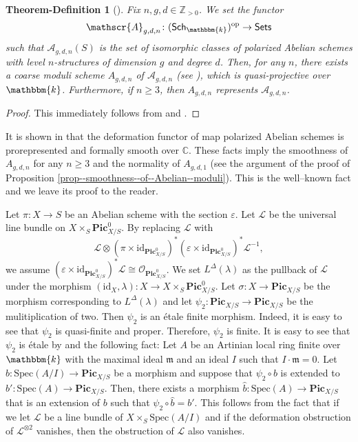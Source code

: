 \documentclass[12pt,twoside]{amsart}
\newtheorem{thm2}[thm]{Theorem-Definition}
\theoremstyle{definition}
\begin{document}
\begin{thm2}[{\cite{GIT}}]\label{thm--abel-scheme}
Fix $n,g,d\in\mathbb{Z}_{>0}$.
We set the functor 
$$\mathscr{A}_{g,d,n}\colon(\mathsf{Sch}_\mathbbm{k})^{\mathrm{op}}\to\mathsf{Sets}$$ such that $\mathscr{A}_{g,d,n}(S)$ is the set of isomorphic classes of polarized Abelian schemes with level $n$-structures of dimension $g$ and degree $d$.
Then, for any $n$, there exists a coarse moduli scheme $A_{g,d,n}$ of $\mathscr{A}_{g,d,n}$ (see \cite[Definition 5.6]{GIT}), which is quasi-projective over $\mathbbm{k}$.
Furthermore, if $n\ge 3$, then $A_{g,d,n}$ represents $\mathscr{A}_{g,d,n}$. 
\end{thm2}

\begin{proof}
    This immediately follows from \cite[Theorem 7.10]{GIT} and \cite[p.~191, Theorem 5]{Ab}.
\end{proof}


It is shown in \cite[Propositions 2.2.3.7 and 2.2.4.4]{Lan} that the deformation functor of map polarized Abelian schemes is prorepresented and formally smooth over $\mathbb{C}$.
These facts imply the smoothness of $A_{g,d,n}$ for any $n\ge3$ and  the normality of $A_{g,d,1}$ (see the argument of the proof of Proposition \ref{prop--smoothness--of--Abelian--moduli}).
This is the well--known fact and we leave its proof to the reader.

Let $\pi\colon X\to S$ be an Abelian scheme with the section $\varepsilon$.
 Let $\mathcal{L}$ be the universal line bundle on $X\times_S\mathbf{Pic}^0_{X/S}$.
    By replacing $\mathcal{L}$ with 
    $$\mathcal{L}\otimes(\pi\times\mathrm{id}_{\mathbf{Pic}^0_{X/S}})^*(\varepsilon\times\mathrm{id}_{\mathbf{Pic}^0_{X/S}})^*\mathcal{L}^{-1},$$ we assume $(\varepsilon\times\mathrm{id}_{\mathbf{Pic}^0_{X/S}})^*\mathcal{L}\cong\mathcal{O}_{\mathbf{Pic}^0_{X/S}}$.
    We set $L^\Delta(\lambda)$ as the pullback of $\mathcal{L}$ under the morphism $(\mathrm{id}_{X},\lambda)\colon X\to X\times_S \mathbf{Pic}^0_{X/S}$.
Let $\sigma\colon X\to \mathbf{Pic}_{X/S}$ be the morphism corresponding to $L^\Delta(\lambda)$ and let $\psi_2\colon \mathbf{Pic}_{X/S}\to \mathbf{Pic}_{X/S}$ be the mulitiplication of two.
Then $\psi_2$ is an \'etale finite morphism.
Indeed, it is easy to see that $\psi_2$ is quasi-finite and proper.
Therefore, $\psi_2$ is finite.
It is easy to see that $\psi_2$ is \'etale by \cite[Theorem 3.1 (iii)]{SGA} and the following fact:
Let $A$ be an Artinian local ring finite over $\mathbbm{k}$ with the maximal ideal $\mathfrak{m}$ and an ideal $I$ such that $I\cdot \mathfrak{m}=0$. 
Let $b\colon\mathrm{Spec}(A/I)\to \mathbf{Pic}_{X/S}$ be a morphism and suppose that $\psi_2\circ b$ is extended to $b'\colon \mathrm{Spec}(A)\to \mathbf{Pic}_{X/S}$.
Then, there exists a morphism $\hat{b}\colon \mathrm{Spec}(A)\to \mathbf{Pic}_{X/S}$ that is an extension of $b$ such that $\psi_2\circ \hat{b}=b'$.
This follows from the fact that if we let $\mathscr{L}$ be a line bundle of $X\times_S\mathrm{Spec}(A/I)$ and if the deformation obstruction of $\mathscr{L}^{\otimes 2}$ vanishes, then the obstruction of $\mathscr{L}$ also vanishes.
\end{document}
